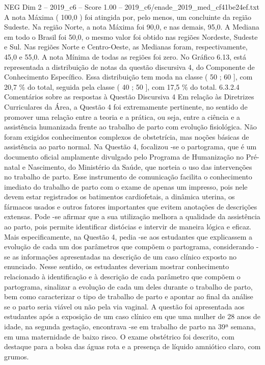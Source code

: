 \begin{textsample}{NEG Dim 2 – 2019\_c6 – Score 1.00 – 2019\_c6/enade\_2019\_med\_cf41be24ef.txt}
A nota Máxima ( 100,0 ) foi atingida por, pelo menos, um concluinte da região Sudeste.
Na região Norte, a nota Máxima foi 90,0, e nas demais, 95,0.
A Mediana em todo o Brasil foi 50,0, o mesmo valor foi obtido nas regiões Nordeste, Sudeste e Sul.
Nas regiões Norte e Centro-Oeste, as Medianas foram, respectivamente, 45,0 e 55,0.
A nota Mínima de todas as regiões foi zero.
No Gráfico 6.13, está representada a distribuição de notas da questão discursiva 4, do Componente de Conhecimento Específico.
Essa distribuição tem moda na classe ( 50 ; 60 ], com 20,7 \% do total, seguida pela classe ( 40 ; 50 ], com 17,5 \% do total. 6.3.2.4 Comentários sobre as respostas à Questão Discursiva 4 Em relação às Diretrizes Curriculares da Área, a Questão 4 foi extremamente pertinente, no sentido de promover uma relação entre a teoria e a prática, ou seja, entre a ciência e a assistência humanizada frente ao trabalho de parto com evolução fisiológica.
Não foram exigidos conhecimentos complexos de obstetrícia, mas noções básicas de assistência ao parto normal.
Na Questão 4, focalizou -se o partograma, que é um documento oficial amplamente divulgado pelo Programa de Humanização no Pré-natal e Nascimento, do Ministério da Saúde, que norteia o uso das intervenções no trabalho de parto.
Esse instrumento de comunicação facilita o conhecimento imediato do trabalho de parto com o exame de apenas um impresso, pois nele devem estar registrados os batimentos cardiofetais, a dinâmica uterina, os fármacos usados e outros fatores importantes que evitem anotações de descrições extensas.
Pode -se afirmar que a sua utilização melhora a qualidade da assistência ao parto, pois permite identificar distócias e intervir de maneira lógica e eficaz.
Mais especificamente, na Questão 4, pedia -se aos estudantes que explicassem a evolução de cada um dos parâmetros que compõem o partograma, considerando -se as informações apresentadas na descrição de um caso clínico exposto no enunciado.
Nesse sentido, os estudantes deveriam mostrar conhecimento relacionado à identificação e à descrição de cada parâmetro que compõem o partograma, sinalizar a evolução de cada um deles durante o trabalho de parto, bem como caracterizar o tipo de trabalho de parto e apontar ao final da análise se o parto seria viável ou não pela via vaginal.
A questão foi apresentada aos estudantes após a exposição de um caso clínico em que uma mulher de 28 anos de idade, na segunda gestação, encontrava -se em trabalho de parto na 39ª semana, em uma maternidade de baixo risco.
O exame obstétrico foi descrito, com destaque para a bolsa das águas rota e a presença de líquido amniótico claro, com grumos.

\end{textsample}
